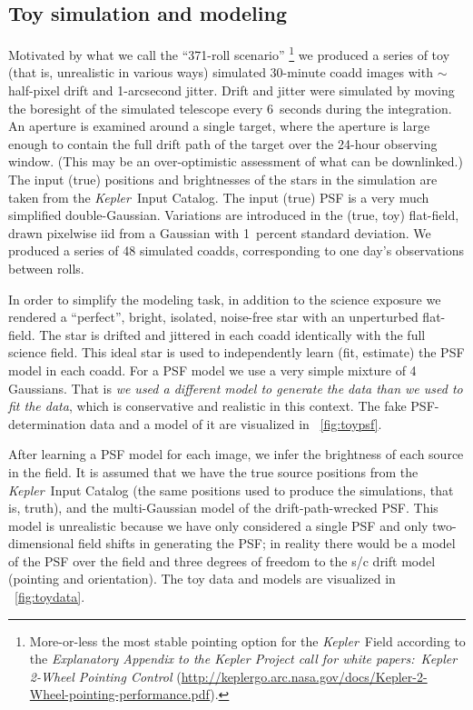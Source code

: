 \documentclass[letterpaper,12pt,whitepaper]{haastex}
\newcommand{\observatory}[1]{\textsl{#1}}
\newcommand{\Kepler}{\observatory{Kepler}}
\begin{document}
\subsection{Toy simulation and modeling}\label{sec:toys}

Motivated by what we call the ``371-roll scenario''%
  \footnote{More-or-less the most stable pointing option for the \Kepler~Field according to
    the \textit{Explanatory Appendix to the Kepler Project
      call for white papers:\ Kepler 2-Wheel Pointing Control}
    (\url{http://keplergo.arc.nasa.gov/docs/Kepler-2-Wheel-pointing-performance.pdf}).}
  we produced a series of toy (that is, unrealistic in various ways)
  simulated 30-minute coadd images with $\sim$ half-pixel drift and 1-arcsecond jitter.
Drift and jitter were simulated by moving the boresight of the simulated telescope
  every 6~seconds during the integration.
An aperture is examined around a single target,
  where the aperture is large enough to contain the full drift path
  of the target over the 24-hour observing window.
(This may be an over-optimistic assessment of what can be downlinked.)
The input (true) positions and brightnesses of the stars in the simulation are
  taken from the \Kepler\ Input Catalog.
The input (true) PSF is a very much simplified double-Gaussian.
Variations are introduced in the (true, toy) flat-field,
   drawn pixelwise iid from a Gaussian with 1~percent standard deviation.
We produced a series of 48 simulated coadds,
   corresponding to one day's observations between rolls.

In order to simplify the modeling task,
  in addition to the science exposure
  we rendered a ``perfect'', bright, isolated, noise-free star with an unperturbed flat-field.
The star is drifted and jittered in each coadd identically with the full science field.
This ideal star is used to independently learn (fit, estimate) the PSF model in each coadd.
For a PSF model we use a very simple mixture of 4 Gaussians.
That is \emph{we used a different model to generate the data than we used to fit the data},
  which is conservative and realistic in this context.
The fake PSF-determination data and a model of it are visualized in \figurename~\ref{fig:toypsf}.

After learning a PSF model for each image,
  we infer the brightness of each source in the field.
It is assumed that we have the true source positions from the \Kepler\ Input Catalog
  (the same positions used to produce the simulations, that is, truth),
  and the multi-Gaussian model of the drift-path-wrecked PSF.
This model is unrealistic because we have only considered a single PSF and only two-dimensional
  field shifts in generating the PSF;
  in reality there would be a model of the PSF over the field
  and three degrees of freedom to the s/c drift model (pointing and orientation).
The toy data and models are visualized in  \figurename~\ref{fig:toydata}.
\end{document}
